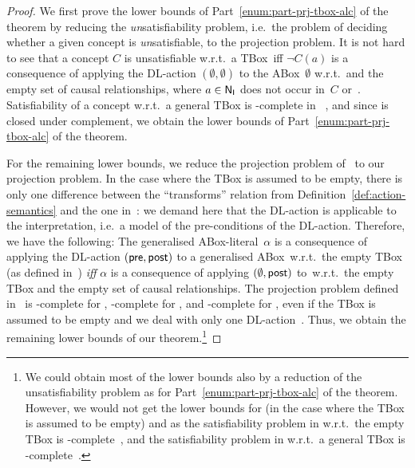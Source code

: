 \begin{proof}
    We first prove the lower bounds of Part~\ref{enum:part-prj-tbox-alc} of the
    theorem by reducing the \emph{un}satisfiability
    problem, i.e.~the problem of deciding whether a given concept is
    \emph{un}satisfiable, to the projection problem.  It is not hard to see that
    a concept $C$ is unsatisfiable w.r.t.\ a TBox~\Tmc iff $\lnot C(a)$ is a
    consequence of applying the DL-action $(\emptyset,\emptyset)$ to
    the ABox~$\emptyset$ w.r.t.~\Tmc and the empty set of causal relationships,
    where $a\in\mathsf{N_I}$ does not occur in~$C$ or~\Tmc.
    Satisfiability of a concept w.r.t.\ a general TBox is \ExpTime-complete in
    \ALC~\cite{Sch-IJCAI91}, and since \ExpTime is closed under complement, we
    obtain the lower bounds of Part~\ref{enum:part-prj-tbox-alc} of the theorem.

    For the remaining lower bounds, we reduce the projection problem
    of~\cite{BLM+-AAAI05} to our projection problem.  In the case where the TBox
    is assumed to be empty, there is only one difference between the
    \enquote{transforms} relation from Definition~\ref{def:action-semantics} and
    the one in~\cite{BLM+-AAAI05}: we demand here that the DL-action is
    applicable to the interpretation, i.e.~a model of the pre-conditions of the
    DL-action.  Therefore, we have the following: The generalised
    ABox-literal~$\alpha$ is a consequence of applying the DL-action
    $(\mathsf{pre},\mathsf{post})$ to a generalised ABox~\Amc w.r.t.\ the empty TBox
    (as defined in~\cite{BLM+-AAAI05}) \emph{iff} $\alpha$ is a consequence of
    applying $(\emptyset,\mathsf{post})$ to~\Amc w.r.t.\ the empty TBox and
    the empty set of causal relationships.  The projection problem defined
    in~\cite{BLM+-AAAI05} is \PSpace-complete for \ALC, \ExpTime-complete
    for \ALCI, and \coNExpTime-complete for \ALCQI, even if the TBox is assumed
    to be empty and we deal with only one DL-action~\cite{BLM+-AAAI05}.  Thus,
    we obtain the remaining lower bounds of our theorem.\footnote{%
        We could obtain most of the lower bounds also by a reduction of the
        unsatisfiability problem as for Part~\ref{enum:part-prj-tbox-alc} of the
        theorem.  However, we would not get the lower bounds for \ALCI (in the
        case where the TBox is assumed to be empty) and \ALCQI as the
        satisfiability problem in \ALCQI w.r.t.\ the empty TBox is
        \PSpace-complete~\cite{Tob-PhD01}, and the satisfiability problem in
        \ALCQI w.r.t.\ a general TBox is \ExpTime-complete~\cite{Tob-PhD01}.}


\end{proof}

